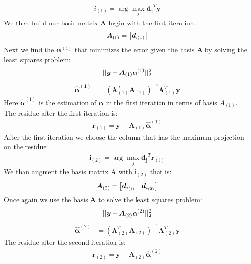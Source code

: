 \documentclass[12pt,letterpaper]{article}
\begin{document}
\begin{align*}
    i_{(1)} = \arg \max_j \bm{d_j}^T \bm{y}
\end{align*}
 We then build our basis matrix $\bm{A}$ begin with the first iteration.
\begin{align*}
    \bm{A}_{(1)} = \mqty[ \bm{d}_{i(1)}]
\end{align*}
Next we find the $\bm{\alpha}^{(1)}$ that minimizes the error given the basis $\bm{A}$ by solving the least squares problem:
\[
||\bm{y}-\bm{A}_{(1)}\bm{\alpha}^{(1)}||_2^2 \\
\]
\begin{align*}
    \bm{\hat{\alpha}^{(1)}} &= (\bm{A}^T_{(1)}\bm{A}_{(1)})^{-1}\bm{A}^T_{(1)} \bm{y}
\end{align*}
Here $\bm{\hat{\alpha}}^{(1)}$ is the estimation of $\bm{\alpha}$ in the first iteration in terms of basis $A_{(1)}$. The residue after the first iteration is:
\begin{align*}
    \bm{r}_{(1)} = \bm{y} - \bm{A}_{(1)} \bm{\hat{\alpha}}^{(1)}
\end{align*}
After the first iteration we choose the column that has the maximum projection on the residue:
\begin{align*}
    \bm{i}_{(2)} = \arg \max_j \bm{d_j}^T \bm{r}_{(1)}
\end{align*}
We than augment the basis matrix $\bm{A}$ with $\bm{i}_{(2)}$ that is:
\begin{align*}
    \bm{A}_{(2)} = \mqty[
      \bm{d}_{i_{(1)}} &  \bm{d}_{i_{(2)}}
    ]
\end{align*}
Once again we use the basis $\bm{A}$ to solve the least squares problem:
\[
||\bm{y}-\bm{A}_{(2)}\bm{\alpha}^{(2)}||_2^2 \\
\]
\begin{align*}
    \bm{\hat{\alpha}}^{(2)} &= (\bm{A}^T_{(2)}\bm{A}_{(2)})^{-1}\bm{A}^T_{(2)} \bm{y}
\end{align*}
The residue after the second iteration is:
\begin{align*}
    \bm{r}_{(2)} = \bm{y} - \bm{A}_{(2)} \bm{\hat{\alpha}}^{(2)}
\end{align*}
\end{document}
